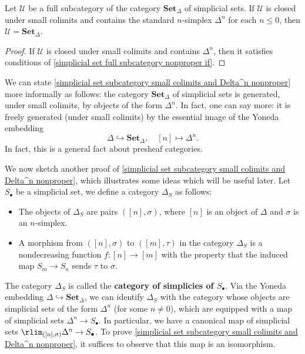 \begin{corollary}\label{simplicial set subcategory small colimits and Delta^n nonproper}
Let $\mathcal{U}$ be a full subcategory of the category $\mathbf{Set}_\Delta$ of simplicial sets. If $\mathcal{U}$ is closed under small colimits and contains the standard $n$-simplex $\Delta^n$ for each $n\leq 0$, then $\mathcal{U}=\mathbf{Set}_\Delta$.
\end{corollary}
\begin{proof}
If $\mathcal{U}$ is closed under small colimits and contains $\Delta^n$, then it satisfies conditions of \cref{simplicial set full subcategory nonproper if}.
\end{proof}
\begin{remark}
We can state \cref{simplicial set subcategory small colimits and Delta^n nonproper} more informally as follows: the category $\mathbf{Set}_\Delta$ of simplicial sets is generated, under small colimits, by objects of the form $\Delta^n$. In fact, one can say more: it is freely generated (under small colimits) by the essential image of the Yoneda embedding
\[\Delta\hookrightarrow\mathbf{Set}_\Delta,\quad [n]\mapsto\Delta^n.\]
In fact, this is a general fact about presheaf categories.
\end{remark}
We now sketch another proof of \cref{simplicial set subcategory small colimits and Delta^n nonproper}, which illustrates some ideas which will be useful later. Let $S_\bullet$ be a simplicial set, we define a category $\Delta_S$ as follows:
\begin{itemize}
\item The objects of $\Delta_S$ are pairs $([n],\sigma)$, where $[n]$ is an object of $\Delta$ and $\sigma$ is an $n$-simplex.
\item A morphism from $([n],\sigma)$ to $([m],\tau)$ in the category $\Delta_S$ is a nondecreasing function $f:[n]\to[m]$ with the property that the induced map $S_m\to S_n$ sends $\tau$ to $\sigma$.
\end{itemize}
The category $\Delta_S$ is called the \textbf{category of simplicies of \boldmath$S_\bullet$}. Via the Yoneda embedding $\Delta\hookrightarrow\mathbf{Set}_\Delta$, we can identify $\Delta_S$ with the category whose objects are simplicial sets of the form $\Delta^n$ (for some $n\neq 0$), which are equipped with a map of simplicial sets $\Delta^n\to S_\bullet$. In particular, we have a canonical map of simplicial sets $\rlim_{([n],\sigma)}\Delta^n\to S_\bullet$. To prove \cref{simplicial set subcategory small colimits and Delta^n nonproper}, it suffices to observe that this map is an isomorphism.\par
